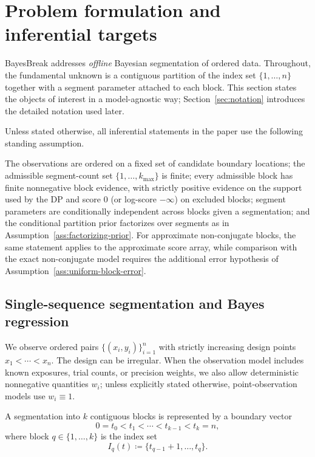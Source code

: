 \section{Problem formulation and inferential targets}
\label{sec:problem}

BayesBreak addresses \emph{offline} Bayesian segmentation of ordered data. Throughout, the
fundamental unknown is a contiguous partition of the index set $\{1,\dots,n\}$ together with a
segment parameter attached to each block. This section states the objects of interest in a
model-agnostic way; Section~\ref{sec:notation} introduces the detailed notation used later.

Unless stated otherwise, all inferential statements in the paper use the following standing assumption.

\begin{assumption}
\label{ass:standing-offline}
The observations are ordered on a fixed set of candidate boundary locations; the admissible
segment-count set $\{1,\dots,k_{\max}\}$ is finite; every admissible block has finite nonnegative
block evidence, with strictly positive evidence on the support used by the DP and score $0$ (or
log-score $-\infty$) on excluded blocks; segment parameters are conditionally independent across
blocks given a segmentation; and the conditional partition prior factorizes over segments as in
Assumption~\ref{ass:factorizing-prior}. For approximate non-conjugate blocks, the same statement
applies to the approximate score array, while comparison with the exact non-conjugate model
requires the additional error hypothesis of Assumption~\ref{ass:uniform-block-error}.
\end{assumption}

\subsection{Single-sequence segmentation and Bayes regression}
\label{sec:problem-single}

We observe ordered pairs $\{(x_i,y_i)\}_{i=1}^n$ with strictly increasing design points
$x_1<\cdots<x_n$. The design can be irregular. When the observation model includes known
exposures, trial counts, or precision weights, we also allow deterministic nonnegative quantities
$w_i$; unless explicitly stated otherwise, point-observation models use $w_i\equiv 1$.

A segmentation into $k$ contiguous blocks is represented by a boundary vector
\begin{equation}
0=t_0<t_1<\cdots<t_{k-1}<t_k=n,
\end{equation}
where block $q\in\{1,\dots,k\}$ is the index set
\begin{equation}
I_q(t)\coloneqq \{t_{q-1}+1,\dots,t_q\}.
\end{equation}

